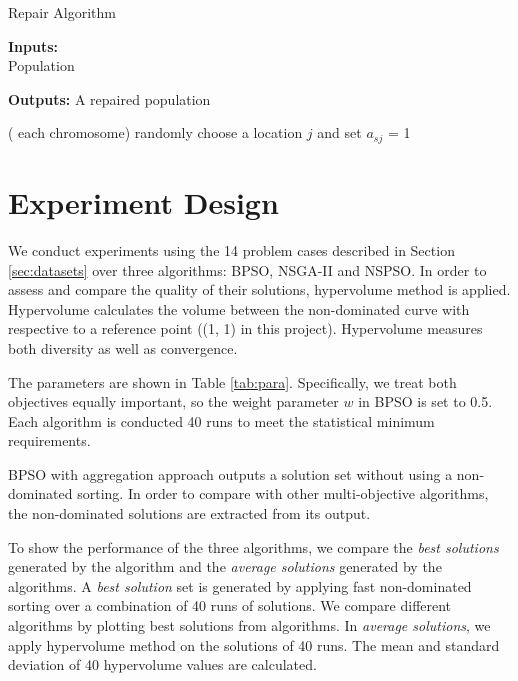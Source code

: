 \begin{algorithm}[!h]
	\caption{Repair Algorithm}
	\footnotesize
	\label{alg:repair}
	\textbf{Inputs:} \\
		Population

	\textbf{Outputs:}
		A repaired population

	\begin{algorithmic}[1]
		\For( each chromosome)
		\State randomly choose a location $j$ and set $a_{sj}$ = 1
		\EndWhile
% 		
	\end{algorithmic}
	\label{alg:repairfunctions}
\end{algorithm}





\section{Experiment Design}
We conduct experiments using the 14 problem cases described in Section \ref{sec:datasets} over three algorithms: BPSO, NSGA-II and NSPSO. In order to assess and compare the quality of their solutions, 
hypervolume method \cite{Auger:2009} is applied. Hypervolume calculates the volume between the non-dominated curve with respective to a reference point ((1, 1) 
in this project). Hypervolume measures both diversity as well as convergence.

The parameters are shown in Table \ref{tab:para}. Specifically, we treat both objectives equally important, so the weight parameter $w$ in BPSO is set 
to 0.5. Each algorithm is conducted 40 runs to meet the statistical minimum requirements.

BPSO with aggregation approach outputs a solution set without using a non-dominated sorting.  In order to compare
with other multi-objective algorithms, the non-dominated solutions are extracted from its output.

To show the performance of the three algorithms, we compare the \emph{best solutions} generated by the algorithm and the \emph{average solutions} generated
by the algorithms.  
A \emph{best solution} set is generated by applying fast non-dominated sorting over a combination of 40 runs of solutions. 
We compare different algorithms by plotting best solutions from algorithms.
In \emph{average solutions}, we apply hypervolume method 
on the solutions of 40 runs.
The mean and standard deviation of 40 hypervolume values are calculated.


